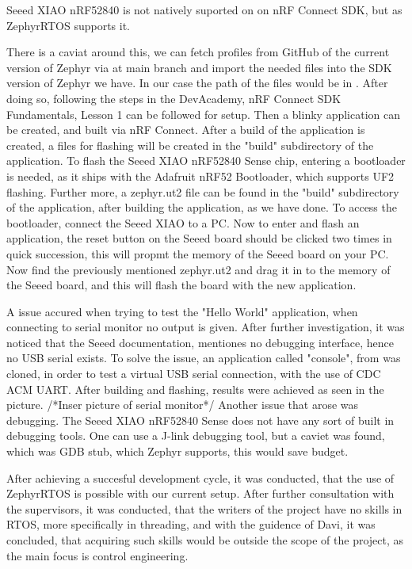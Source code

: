 \documentclass[a4paper,11pt]{article}
\begin{document}
Seeed XIAO nRF52840 is not natively suported on on nRF Connect SDK, but as ZephyrRTOS supports it. \cite{docsZephyr}

There is a caviat around this, we can fetch profiles from GitHub of the current version of Zephyr via  at main branch \cite{gitZephyr} and import the needed files into the SDK version of Zephyr we have.
In our case the path of the files would be in  .
After doing so, following the steps in the DevAcademy, nRF Connect SDK Fundamentals, Lesson 1 can be followed for setup. Then a blinky application can be created, and built via nRF Connect.
After a build of the application is created, a files for flashing will be created in the "build" subdirectory of the application.
To flash the Seeed XIAO nRF52840 Sense chip, entering a bootloader is needed, as it ships with the Adafruit nRF52 Bootloader, which supports UF2 flashing. \cite{docsZephyr}
Further more, a zephyr.ut2 file can be found in the "build" subdirectory of the application, after building the application, as we have done.
To access the bootloader, connect the Seeed XIAO to a PC.
Now to enter and flash an application, the reset button on the Seeed board should be clicked two times in quick succession, this will propmt the memory of the Seeed board on your PC.
Now find the previously mentioned zephyr.ut2 and drag it in to the memory of the Seeed board, and this will flash the board with the new application.

A issue accured when trying to test the "Hello World" application, when connecting to serial monitor no output is given.
After further investigation, it was noticed that the Seeed documentation, mentiones no debugging interface, hence no USB serial exists.
To solve the issue, an application called "console", from  was cloned, in order to test a virtual USB serial connection, with the use of CDC ACM UART. \cite{gitZephyr}
After building and flashing, results were achieved as seen in the picture.
/*Inser picture of serial monitor*/
Another issue that arose was debugging. The Seeed XIAO nRF52840 Sense does not have any sort of built in debugging tools. \cite{wikiSeeed}
One can use a J-link debugging tool, but a caviet was found, which was GDB stub, which Zephyr supports, this would save budget. \cite{docsZephyr}

After achieving a succesful development cycle, it was conducted, that the use of ZephyrRTOS is possible with our current setup.
After further consultation with the supervisors, it was conducted, that the writers of the project have no skills in RTOS, more specifically in threading, and with the guidence of Davi, it was concluded, that acquiring such skills would be outside the scope of the project, as the main focus is control engineering.



\end{document}
